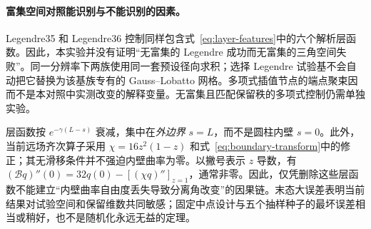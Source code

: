 \paragraph{富集空间对照能识别与不能识别的因素。}
Legendre35 和 Legendre36 控制同样包含式~\eqref{eq:layer-features}中的六个解析层函数。因此，本实验并没有证明“无富集的 Legendre 成功而无富集的三角空间失败”。同一分辨率下两族使用同一套预设径向求积；选择 Legendre 试验基不会自动把它替换为该基族专有的 Gauss--Lobatto 网格。多项式插值节点的端点聚束因而不是本对照中实测改变的解释变量。无富集且匹配保留秩的多项式控制仍需单独实验。

层函数按 $e^{-\gamma(L-s)}$ 衰减，集中在\emph{外边界} $s=L$，而不是圆柱内壁 $s=0$。此外，当前远场齐次算子采用 $\chi=16z^2(1-z)$ 和式~\eqref{eq:boundary-transform}中的修正；其无滑移条件并不强迫内壁曲率为零。以撇号表示 $z$ 导数，有 $(\mathcal Bq)''(0)=32q(0)-[(\chi q)'']_{z=1}$，通常非零。因此，仅凭删除这些层函数不能建立“内壁曲率自由度丢失导致分离角改变”的因果链。末态大误差表明当前结果对试验空间和保留维数共同敏感；固定中点设计与五个抽样种子的最坏误差相当或稍好，也不是随机化永远无益的定理。
